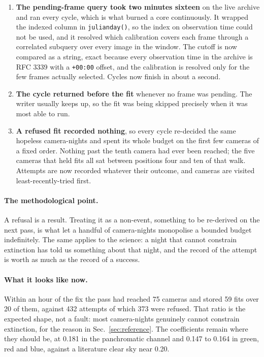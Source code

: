\documentclass[11pt,a4paper]{article}
\begin{document}
\begin{enumerate}
  \item \textbf{The pending-frame query took two minutes sixteen} on the live
    archive and ran every cycle, which is what burned a core continuously. It
    wrapped the indexed column in \texttt{julianday()}, so the index on
    observation time could not be used, and it resolved which calibration covers
    each frame through a correlated subquery over every image in the window. The
    cutoff is now compared as a string, exact because every observation time in
    the archive is RFC 3339 with a \texttt{+00:00} offset, and the calibration is
    resolved only for the few frames actually selected. Cycles now finish in
    about a second.
  \item \textbf{The cycle returned before the fit} whenever no frame was
    pending. The writer usually keeps up, so the fit was being skipped precisely
    when it was most able to run.
  \item \textbf{A refused fit recorded nothing}, so every cycle re-decided the
    same hopeless camera-nights and spent its whole budget on the first few
    cameras of a fixed order. Nothing past the tenth camera had ever been
    reached; the five cameras that held fits all sat between positions four and
    ten of that walk. Attempts are now recorded whatever their outcome, and
    cameras are visited least-recently-tried first.
\end{enumerate}

\paragraph{The methodological point.} A refusal is a result. Treating it as a
non-event, something to be re-derived on the next pass, is what let a handful of
camera-nights monopolise a bounded budget indefinitely. The same applies to the
science: a night that cannot constrain extinction has told us something about
that night, and the record of the attempt is worth as much as the record of a
success.

\paragraph{What it looks like now.} Within an hour of the fix the pass had
reached 75 cameras and stored 59 fits over 20 of them, against 432 attempts of
which 373 were refused. That ratio is the expected shape, not a fault: most
camera-nights genuinely cannot constrain extinction, for the reason in
Sec.~\ref{sec:reference}. The coefficients remain where they should be, at
\num{0.181} in the panchromatic channel and \num{0.147} to \num{0.164} in green,
red and blue, against a literature clear sky near \num{0.20}.
\end{document}
